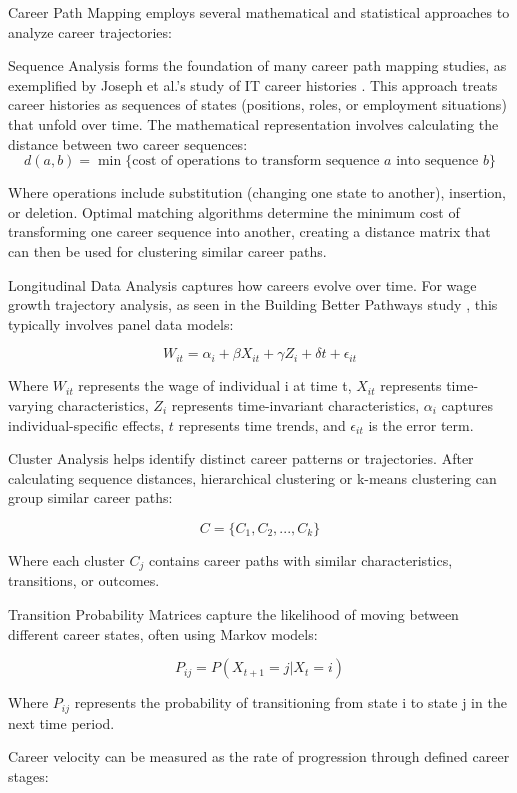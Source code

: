 \documentclass{article}
\begin{document}
Career Path Mapping employs several mathematical and statistical approaches to analyze career trajectories:

Sequence Analysis forms the foundation of many career path mapping studies, as exemplified by Joseph et al.'s study of IT career histories \citep{joseph2012}. This approach treats career histories as sequences of states (positions, roles, or employment situations) that unfold over time. The mathematical representation involves calculating the distance between two career sequences:
\[ d(a, b) = \min \{\text{cost of operations to transform sequence } a \text{ into sequence } b\} \]

Where operations include substitution (changing one state to another), insertion, or deletion. Optimal matching algorithms determine the minimum cost of transforming one career sequence into another, creating a distance matrix that can then be used for clustering similar career paths.

Longitudinal Data Analysis captures how careers evolve over time. For wage growth trajectory analysis, as seen in the Building Better Pathways study \citep{workforcegps2023}, this typically involves panel data models:

\[ W_{it} = \alpha_i + \beta X_{it} + \gamma Z_i + \delta t + \epsilon_{it} \]

Where \(W_{it}\) represents the wage of individual i at time t, \(X_{it}\) represents time-varying characteristics, \(Z_i\) represents time-invariant characteristics, \(\alpha_i\) captures individual-specific effects, \(t\) represents time trends, and \(\epsilon_{it}\) is the error term.

Cluster Analysis helps identify distinct career patterns or trajectories. After calculating sequence distances, hierarchical clustering or k-means clustering can group similar career paths:

\[ C = \{C_1, C_2, ..., C_k\} \]

Where each cluster \(C_j\) contains career paths with similar characteristics, transitions, or outcomes.

Transition Probability Matrices capture the likelihood of moving between different career states, often using Markov models:

\[ P_{ij} = P(X_{t+1} = j | X_t = i) \]

Where \(P_{ij}\) represents the probability of transitioning from state i to state j in the next time period.

Career velocity can be measured as the rate of progression through defined career stages:
\end{document}
